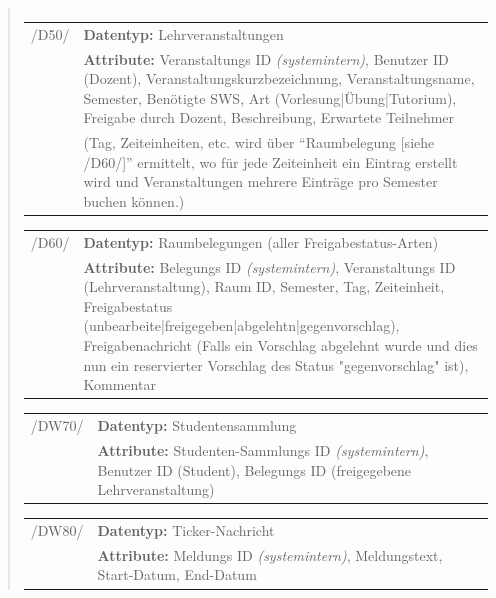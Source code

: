 \begin{quote}
\begin{tabular}{p{1.5cm}p{14.5cm}}
\end{tabular}


\begin{tabular}{p{1.5cm}p{14.5cm}}
	
	 /D50/	& \textbf{Datentyp:} Lehrveranstaltungen \\
				& \textbf{Attribute:} Veranstaltungs ID \textsl{(systemintern)}, Benutzer ID (Dozent), Veranstaltungskurzbezeichnung, Veranstaltungsname, Semester, Benötigte SWS, Art (Vorlesung|Übung|Tutorium), Freigabe durch Dozent, Beschreibung, Erwartete Teilnehmer\\ 
				&(Tag, Zeiteinheiten, etc. wird über "`Raumbelegung [siehe /D60/]"' ermittelt, wo für jede Zeiteinheit ein Eintrag erstellt wird und Veranstaltungen mehrere Einträge pro Semester buchen können.) \\[0.25cm]

\end{tabular}


\begin{tabular}{p{1.5cm}p{14.5cm}}
					
	 /D60/	& \textbf{Datentyp:} Raumbelegungen (aller Freigabestatus-Arten) \\
				& \textbf{Attribute:} Belegungs ID \textsl{(systemintern)}, Veranstaltungs ID (Lehrveranstaltung), Raum ID, Semester, Tag, Zeiteinheit, Freigabestatus (unbearbeite|freigegeben|abgelehtn|gegenvorschlag), Freigabenachricht (Falls ein Vorschlag abgelehnt wurde und dies nun ein reservierter Vorschlag des Status "gegenvorschlag" ist), Kommentar  \\[0.25cm]

\end{tabular}


\begin{tabular}{p{1.5cm}p{14.5cm}}
		
	 /DW70/& \textbf{Datentyp:} Studentensammlung \\
				& \textbf{Attribute:} Studenten-Sammlungs ID \textsl{(systemintern)}, Benutzer ID (Student), Belegungs ID (freigegebene Lehrveranstaltung) \\[0.25cm]

\end{tabular}


\begin{tabular}{p{1.5cm}p{14.5cm}}
					
	 /DW80/& \textbf{Datentyp:} Ticker-Nachricht \\
				& \textbf{Attribute:} Meldungs ID \textsl{(systemintern)}, Meldungstext, Start-Datum, End-Datum \\[0.25cm]
		

\end{tabular}
\end{quote}
